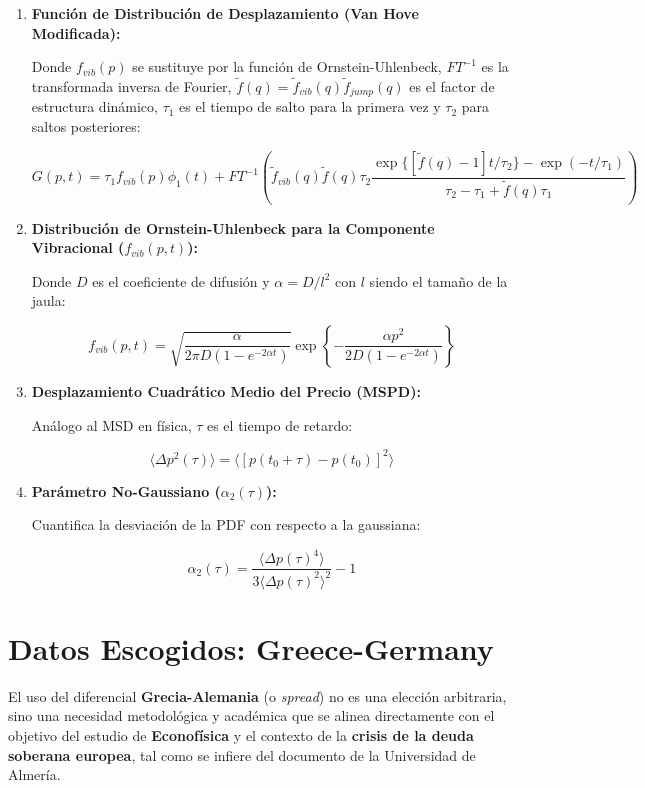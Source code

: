 \documentclass[12pt,a4paper]{article}
\begin{document}
\begin{enumerate}
    \item \textbf{Función de Distribución de Desplazamiento (Van Hove Modificada):}

    Donde $f_{vib}(p)$ se sustituye por la función de Ornstein-Uhlenbeck, $FT^{-1}$ es la transformada inversa de Fourier, $\tilde{f}(q) = \tilde{f}_{vib}(q)\tilde{f}_{jump}(q)$ es el factor de estructura dinámico, $\tau_{1}$ es el tiempo de salto para la primera vez y $\tau_{2}$ para saltos posteriores:

    $$
    G(p,t) = \tau_{1}f_{vib}(p)\phi_{1}(t) + FT^{-1}\left(\tilde{f}_{vib}(q)\tilde{f}(q)\tau_{2}\frac{\exp\{[\tilde{f}(q)-1]t/\tau_{2}\}-\exp(-t/\tau_{1})}{\tau_{2}-\tau_{1}+\tilde{f}(q)\tau_{1}}\right)
    $$

    \item \textbf{Distribución de Ornstein-Uhlenbeck para la Componente Vibracional ($f_{vib}(p, t)$):}

    Donde $D$ es el coeficiente de difusión y $\alpha = D/l^2$ con $l$ siendo el tamaño de la jaula:

    $$
    f_{vib}(p,t) = \sqrt{\frac{\alpha}{2\pi D(1-e^{-2\alpha t})}}\exp\left\{-\frac{\alpha p^{2}}{2D(1-e^{-2\alpha t})}\right\}
    $$

    \item \textbf{Desplazamiento Cuadrático Medio del Precio (MSPD):}

    Análogo al MSD en física, $\tau$ es el tiempo de retardo:

    $$
    \langle\Delta p^{2}(\tau)\rangle=\langle[p(t_{0}+\tau)-p(t_{0})]^{2}\rangle
    $$

    \item \textbf{Parámetro No-Gaussiano ($\alpha_2(\tau)$):}

    Cuantifica la desviación de la PDF con respecto a la gaussiana:

    $$
    \alpha_{2}(\tau)=\frac{\langle\Delta p(\tau)^{4}\rangle}{3\langle\Delta p(\tau)^{2}\rangle^{2}}-1
    $$
\end{enumerate}

\section{Datos Escogidos: Greece-Germany}

El uso del diferencial \textbf{Grecia-Alemania} (o \emph{spread}) no es una elección arbitraria, sino una necesidad metodológica y académica que se alinea directamente con el objetivo del estudio de \textbf{Econofísica} y el contexto de la \textbf{crisis de la deuda soberana europea}, tal como se infiere del documento de la Universidad de Almería.
\end{document}
